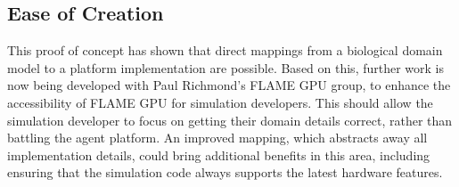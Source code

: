 \documentclass{UoYCSproject}
\begin{document}
\subsection{Ease of Creation}
This proof of concept has shown that direct mappings from a biological domain model to a platform implementation are possible.
Based on this, further work is now being developed with Paul Richmond's \gls{FLAME GPU} group, to enhance the accessibility of \gls{FLAME GPU} for simulation developers.
This should allow the simulation developer to focus on getting their domain details correct, rather than battling the agent platform.
An improved mapping, which abstracts away all implementation details, could bring additional benefits in this area, including ensuring that the simulation code always supports the latest hardware features.

\end{document}
